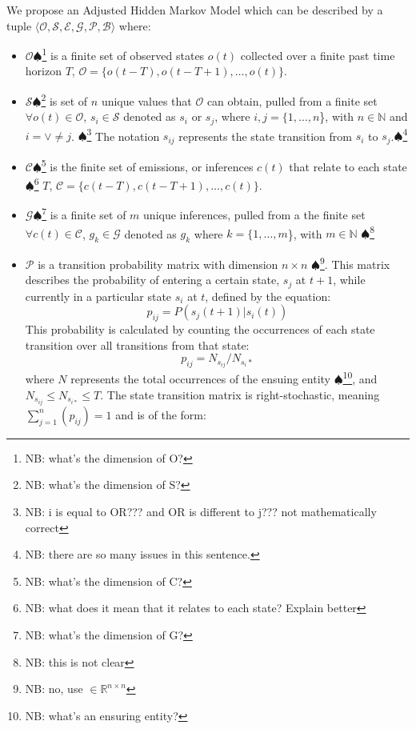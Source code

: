 \documentclass[letterpaper, 10 pt, conference]{ieeeconf}  %
\newcommand\NB[1]{$\spadesuit$\footnote{NB: #1}}
\begin{document}
We propose an Adjusted Hidden Markov Model which can be described by a tuple $\langle \mathcal{O},\mathcal{S},\mathcal{E},\mathcal{G},\mathcal{P},\mathcal{B} \rangle$  where:
\begin{itemize}
    \item $\mathcal{O}$\NB{what's the dimension of O?} is a finite set of observed states $o(t)$ collected over a finite past time horizon $T$, $\mathcal{O} = \{ o(t-T), o(t-T+1), \ldots, o(t)\}$. 
    \item  $\mathcal{S}$\NB{what's the dimension of S?} is set of $n$ unique values that $\mathcal{O}$ can obtain, pulled from a finite set $\forall o(t)\in\mathcal{O}$, $s_i \in \mathcal{S}$ denoted as $s_{i}$ or $s_{j}$, where $i,j = \{1,\ldots,n$\}, with $n \in \mathbb{N}$ and $i = \lor \neq j$. \NB{i is equal to OR??? and OR is different to j??? not mathematically correct} The notation $s_{ij}$ represents the state transition from $s_i$ to $s_j$.\NB{there are so many issues in this sentence.}
    \item $\mathcal{C}$\NB{what's the dimension of C?} is the finite set of emissions, or inferences $c(t)$ that relate to each state \NB{what does it mean that it relates to each state? Explain better} $T$, $\mathcal{C} = \{ c(t-T), c(t-T+1), \ldots, c(t)\}$.  
    \item $\mathcal{G}$\NB{what's the dimension of G?} is a finite set of $m$ unique inferences, pulled from a the finite set $\forall c(t)\in\mathcal{C}$, $g_k \in \mathcal{G}$ denoted as $g_{k}$ where $k = \{1,\ldots,m$\}, with $m \in \mathbb{N}$ \NB{this is not clear}
    \item $\mathcal{P}$ is a transition probability matrix with dimension $n \times n$ \NB{no, use $\in \mathbb{R}^{n\times n}$}. This matrix describes the probability of entering a certain state, $s_{j}$ at $t+1$, while currently in a particular state $s_{i}$ at $t$, defined by the equation:
        \begin{equation}
            p_{ij} = P(s_j(t+1) \vert s_i(t))
        \end{equation}
        This probability is calculated by counting the occurrences of each state transition over all transitions from that state:
        \begin{equation} \label{eq:transbuild}
            p_{ij} = N_{s_{ij}}/N_{s_{i}*}
        \end{equation}
        where $N$ represents the total occurrences of the ensuing entity \NB{what's an ensuring entity?}, and $N_{s_{ij}} \leq N_{s_{i*}} \leq T$. The state transition matrix is right-stochastic, meaning $\sum_{j=1}^{n}(p_{ij}) = 1$ and is of the form:

\end{itemize}
\end{document}
